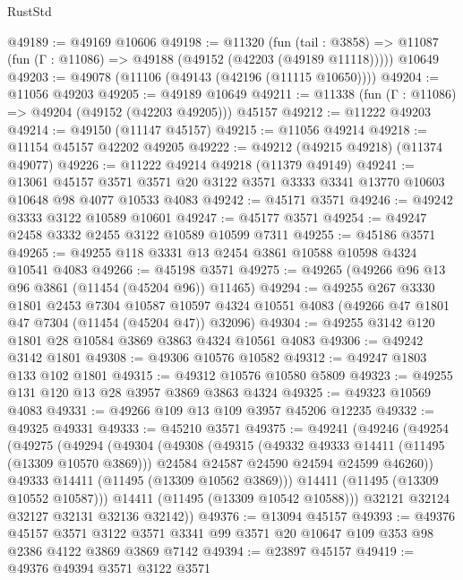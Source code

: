 \begin{lexlean}{RustStd}
\begin{coremodule}
@49189 := @49169 @10606
@49198 := @11320
    (fun (tail : @3858) => @11087 (fun (Γ : @11086) => @49188 (@49152 (@42203 (@49189 @11118)))))
    @10649
@49203 := @49078 (@11106 (@49143 (@42196 (@11115 @10650))))
@49204 := @11056 @49203
@49205 := @49189 @10649
@49211 := @11338 (fun (Γ : @11086) => @49204 (@49152 (@42203 @49205))) @45157
@49212 := @11222 @49203
@49214 := @49150 (@11147 @45157)
@49215 := @11056 @49214
@49218 := @11154 @45157 @42202 @49205
@49222 := @49212 (@49215 @49218) (@11374 @49077)
@49226 := @11222 @49214 @49218 (@11379 @49149)
@49241 := @13061
    @45157
    @3571
    @3571
    @20
    @3122
    @3571
    @3333
    @3341
    @13770
    @10603
    @10648
    @98
    @4077
    @10533
    @4083
@49242 := @45171 @3571
@49246 := @49242 @3333 @3122 @10589 @10601
@49247 := @45177 @3571
@49254 := @49247 @2458 @3332 @2455 @3122 @10589 @10599 @7311
@49255 := @45186 @3571
@49265 := @49255 @118 @3331 @13 @2454 @3861 @10588 @10598 @4324 @10541 @4083
@49266 := @45198 @3571
@49275 := @49265 (@49266 @96 @13 @96 @3861 (@11454 (@45204 @96)) @11465)
@49294 := @49255
    @267
    @3330
    @1801
    @2453
    @7304
    @10587
    @10597
    @4324
    @10551
    @4083
    (@49266 @47 @1801 @47 @7304 (@11454 (@45204 @47)) @32096)
@49304 := @49255 @3142 @120 @1801 @28 @10584 @3869 @3863 @4324 @10561 @4083
@49306 := @49242 @3142 @1801
@49308 := @49306 @10576 @10582
@49312 := @49247 @1803 @133 @102 @1801
@49315 := @49312 @10576 @10580 @5809
@49323 := @49255 @131 @120 @13 @28 @3957 @3869 @3863 @4324
@49325 := @49323 @10569 @4083
@49331 := @49266 @109 @13 @109 @3957 @45206 @12235
@49332 := @49325 @49331
@49333 := @45210 @3571
@49375 := @49241
    (@49246
      (@49254
        (@49275
          (@49294
            (@49304
              (@49308
                (@49315
                  (@49332 @49333 @14411 (@11495 (@13309 @10570 @3869)))
                  @24584
                  @24587
                  @24590
                  @24594
                  @24599
                  @46260))
              @49333
              @14411
              (@11495 (@13309 @10562 @3869)))
            @14411
            (@11495 (@13309 @10552 @10587)))
          @14411
          (@11495 (@13309 @10542 @10588)))
        @32121
        @32124
        @32127
        @32131
        @32136
        @32142))
@49376 := @13094 @45157
@49393 := @49376
    @45157
    @3571
    @3122
    @3571
    @3341
    @99
    @3571
    @20
    @10647
    @109
    @353
    @98
    @2386
    @4122
    @3869
    @3869
    @7142
@49394 := @23897 @45157
@49419 := @49376
    @49394
    @3571
    @3122
    @3571

\end{coremodule}
\end{lexlean}
